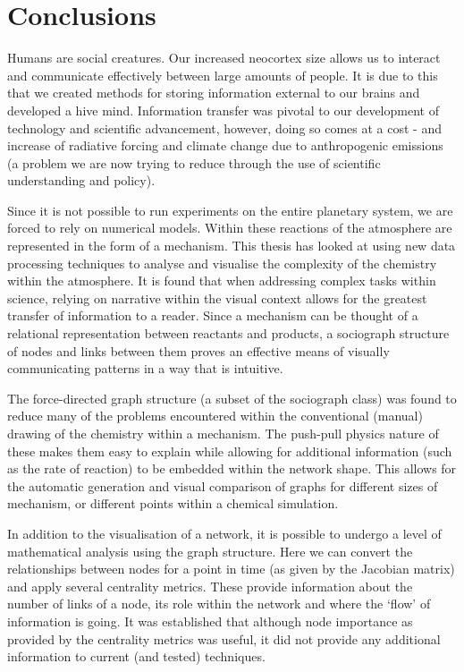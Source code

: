 \section{Conclusions}

Humans are social creatures. Our increased neocortex size allows us to interact and communicate effectively between large amounts of people. It is due to this that we created methods for storing information external to our brains and developed a hive mind. Information transfer was pivotal to our development of technology and scientific advancement, however, doing so comes at a cost - and increase of radiative forcing and climate change due to anthropogenic emissions (a problem we are now trying to reduce through the use of scientific understanding and policy).

Since it is not possible to run experiments on the entire planetary system, we are forced to rely on numerical models. Within these reactions of the atmosphere are represented in the form of a mechanism. This thesis has looked at using new data processing techniques to analyse and visualise the complexity of the chemistry within the atmosphere. It is found that when addressing complex tasks within science, relying on narrative within the visual context allows for the greatest transfer of information to a reader.
Since a mechanism can be thought of a relational representation between reactants and products, a sociograph structure of nodes and links between them proves an effective means of visually communicating patterns in a way that is intuitive.

The force-directed graph structure (a subset of the sociograph class) was found to reduce many of the problems encountered within the conventional (manual) drawing of the chemistry within a mechanism. The push-pull physics nature of these makes them easy to explain while allowing for additional information (such as the rate of reaction) to be embedded within the network shape. This allows for the automatic generation and visual comparison of graphs for different sizes of mechanism, or different points within a chemical simulation.

In addition to the visualisation of a network, it is possible to undergo a level of mathematical analysis using the graph structure. Here we can convert the relationships between nodes for a point in time (as given by the Jacobian matrix) and apply several centrality metrics. These provide information about the number of links of a node,  its role within the network and where the `flow' of information is going. It was established that although node importance as provided by the centrality metrics was useful, it did not provide any additional information to current (and tested) techniques.

